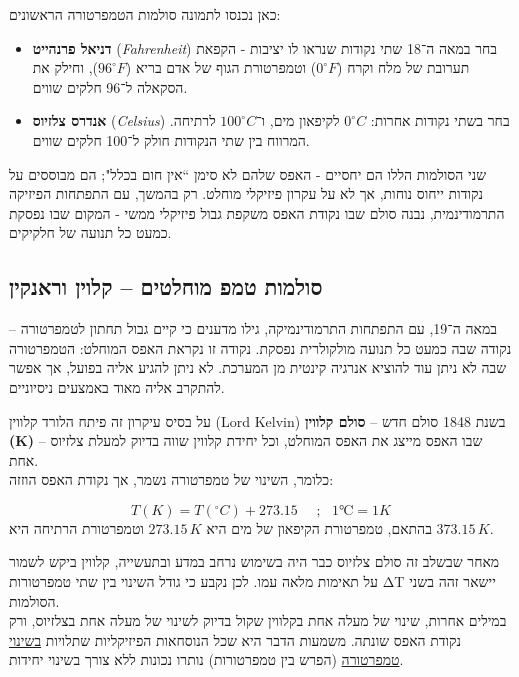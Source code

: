 \documentclass[
  hebrew,
  letterpaper,
  DIV=11,
  numbers=noendperiod]{scrreprt}
\begin{document}
{כאן נכנסו לתמונה סולמות הטמפרטורה הראשונים}:

\begin{itemize}
\item
  \textbf{דניאל פרנהייט} (\emph{Fahrenheit}) בחר במאה ה־18 שתי נקודות
  שנראו לו יציבות - הקפאת תערובת של מלח וקרח (\(0^\circ F\)) וטמפרטורת
  הגוף של אדם בריא (\(96^\circ F\)), וחילק את הסקאלה ל־96 חלקים שווים.
\item
  \textbf{אנדרס צלזיוס} (\emph{Celsius}) בחר בשתי נקודות אחרות:
  \(0^\circ C\) לקיפאון מים, ו־\(100^\circ C\) לרתיחה. המרווח בין שתי
  הנקודות חולק ל־100 חלקים שווים.
\end{itemize}

{שני הסולמות הללו הם יחסיים - האפס שלהם לא סימן ``אין חום בכלל"}; {הם
מבוססים על נקודות ייחוס נוחות, אך לא על עקרון פיזיקלי מוחלט}. {רק בהמשך,
עם התפתחות הפיזיקה התרמודינמית, נבנה סולם שבו נקודת האפס משקפת גבול
פיזיקלי ממשי - המקום שבו נפסקת כמעט כל תנועה של חלקיקים}.

\subsection{\texorpdfstring{{סולמות טמפ\textquotesingle{} מוחלטים --
קלוין
וראנקין}}{סולמות טמפ\textquotesingle{} מוחלטים -- קלוין וראנקין}}\label{ux5e1ux5d5ux5dcux5deux5d5ux5ea-ux5d8ux5deux5e4-ux5deux5d5ux5d7ux5dcux5d8ux5d9ux5dd-ux5e7ux5dcux5d5ux5d9ux5df-ux5d5ux5e8ux5d0ux5e0ux5e7ux5d9ux5df}

{במאה ה־19, עם התפתחות התרמודינמיקה}, {גילו מדענים כי קיים גבול תחתון
לטמפרטורה -- נקודה שבה כמעט כל תנועה מולקולרית נפסקת}. {נקודה זו נקראת
האפס המוחלט}: {הטמפרטורה שבה לא ניתן עוד להוציא אנרגיה קינטית מן
המערכת}. {לא ניתן להגיע אליה בפועל, אך אפשר להתקרב אליה מאוד באמצעים
ניסיוניים}.

{על בסיס עיקרון זה פיתח הלורד קלווין} (Lord Kelvin) {בשנת 1848 סולם חדש}
-- \textbf{{סולם קלווין} (K)} -- {שבו האפס מייצג את האפס המוחלט, וכל
יחידת קלווין שווה בדיוק למעלת צלזיוס אחת}.\\
{כלומר, השינוי של טמפרטורה נשמר, אך נקודת האפס הוזזה}:

\[T(K) = T({^\circ}C) + 273.15\ \ \ \ \ \ ;\ \ \ 1℃ = 1K\] בהתאם,
טמפרטורת הקיפאון של מים היא \(273.15\,K\) וטמפרטורת הרתיחה היא
\(373.15\,K\).

{מאחר שבשלב זה סולם צלזיוס כבר היה בשימוש נרחב במדע ובתעשייה}, {קלווין
ביקש לשמור על תאימות מלאה עמו}. {לכן נקבע כי גודל השינוי בין שתי
טמפרטורות} ΔT {יישאר זהה בשני הסולמות}.\\
{במילים אחרות, שינוי של מעלה אחת בקלווין שקול בדיוק לשינוי של מעלה אחת
בצלזיוס, ורק נקודת האפס שונתה}. {משמעות הדבר היא שכל הנוסחאות הפיזיקליות
שתלויות \ul{בשינוי טמפרטורה} (הפרש בין טמפרטורות) נותרו נכונות ללא צורך
בשינוי יחידות.}
\end{document}
